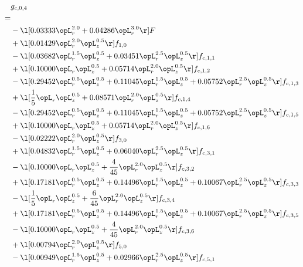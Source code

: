 \begin{alignat}{2} 
\label{eq:g_04_0} 
& g_{c,0,4} \nonumber \\ 
 = \\ 
& - \l[  0.03333 \opL_r^{2.0} +  0.04286 \opL_r^{3.0}  \r] F \nonumber \\ 
& + \l[  0.01429 \opL_r^{2.0} \opL_z^{0.5}  \r] f_{1,0} \nonumber \\ 
& - \l[  0.03682 \opL_r^{1.5} \opL_z^{0.5} +  0.03451 \opL_r^{2.5} \opL_z^{0.5}  \r] f_{c,1,1} \nonumber \\ 
& + \l[  0.10000 \opL_r \opL_z^{0.5} +  0.05714 \opL_r^{2.0} \opL_z^{0.5}  \r] f_{c,1,2} \nonumber \\ 
& - \l[  0.29452 \opL_r^{0.5} \opL_z^{0.5} +  0.11045 \opL_r^{1.5} \opL_z^{0.5} +  0.05752 \opL_r^{2.5} \opL_z^{0.5}  \r] f_{c,1,3} \nonumber \\ 
& + \l[ \frac{1}{5} \opL_r \opL_z^{0.5} +  0.08571 \opL_r^{2.0} \opL_z^{0.5}  \r] f_{c,1,4} \nonumber \\ 
& - \l[  0.29452 \opL_r^{0.5} \opL_z^{0.5} +  0.11045 \opL_r^{1.5} \opL_z^{0.5} +  0.05752 \opL_r^{2.5} \opL_z^{0.5}  \r] f_{c,1,5} \nonumber \\ 
& + \l[  0.10000 \opL_r \opL_z^{0.5} +  0.05714 \opL_r^{2.0} \opL_z^{0.5}  \r] f_{c,1,6} \nonumber \\ 
& - \l[  0.02222 \opL_r^{2.0} \opL_z^{0.5}  \r] f_{3,0} \nonumber \\ 
& + \l[  0.04832 \opL_r^{1.5} \opL_z^{0.5} +  0.06040 \opL_r^{2.5} \opL_z^{0.5}  \r] f_{c,3,1} \nonumber \\ 
& - \l[  0.10000 \opL_r \opL_z^{0.5} + \frac{4}{45} \opL_r^{2.0} \opL_z^{0.5}  \r] f_{c,3,2} \nonumber \\ 
& + \l[  0.17181 \opL_r^{0.5} \opL_z^{0.5} +  0.14496 \opL_r^{1.5} \opL_z^{0.5} +  0.10067 \opL_r^{2.5} \opL_z^{0.5}  \r] f_{c,3,3} \nonumber \\ 
& - \l[ \frac{1}{5} \opL_r \opL_z^{0.5} + \frac{6}{45} \opL_r^{2.0} \opL_z^{0.5}  \r] f_{c,3,4} \nonumber \\ 
& + \l[  0.17181 \opL_r^{0.5} \opL_z^{0.5} +  0.14496 \opL_r^{1.5} \opL_z^{0.5} +  0.10067 \opL_r^{2.5} \opL_z^{0.5}  \r] f_{c,3,5} \nonumber \\ 
& - \l[  0.10000 \opL_r \opL_z^{0.5} + \frac{4}{45} \opL_r^{2.0} \opL_z^{0.5}  \r] f_{c,3,6} \nonumber \\ 
& + \l[  0.00794 \opL_r^{2.0} \opL_z^{0.5}  \r] f_{5,0} \nonumber \\ 
& - \l[  0.00949 \opL_r^{1.5} \opL_z^{0.5} +  0.02966 \opL_r^{2.5} \opL_z^{0.5}  \r] f_{c,5,1} \nonumber \\ 

\end{alignat}
